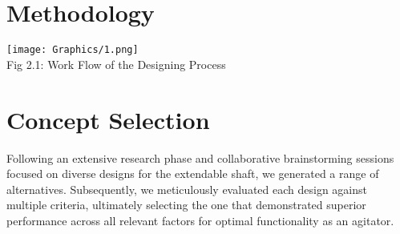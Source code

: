 \documentclass[a4,10pt]{report}
\begin{document}
\section{Methodology}
\begin{center}
    \texttt{[image: Graphics/1.png]} \\
    Fig 2.1: Work Flow of the Designing Process \\
\end{center}


\section{Concept Selection}
Following an extensive research phase and collaborative brainstorming sessions focused on diverse designs for the extendable shaft, we generated a range of alternatives. Subsequently, we meticulously evaluated each design against multiple criteria, ultimately selecting the one that demonstrated superior performance across all relevant factors for optimal functionality as an agitator.
\end{document}
